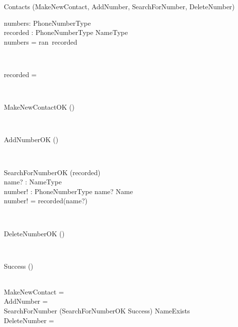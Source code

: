 \begin{class}{Contacts}
\also
\upharpoonright (MakeNewContact, AddNumber, SearchForNumber, DeleteNumber) \\
\begin{state}
numbers:  PhoneNumberType\\
recorded : PhoneNumberType \rightarrow NameType\\
\where
numbers = ran~recorded
\end{state} \\
\begin{init}
recorded = \emptyset %
\end{init} \\
\begin{op}{MakeNewContactOK}
\Delta () \\
\ST
\end{op}\\
\begin{op}{AddNumberOK}
\Delta () \\
\ST
\end{op}\\
\begin{op}{SearchForNumberOK}
    \Xi (recorded) \\
    name? : NameType\\
    number! :  PhoneNumberType
    \ST
    name? \in Name\\
    number! = recorded(name?)
    \end{op}\\
\begin{op}{DeleteNumberOK}
\Delta () \\
\ST
\end{op}\\
\begin{op}{Success}
\Delta () \\
\ST
\end{op}\\ %
\also
MakeNewContact =\\
AddNumber = \\
SearchForNumber \sdef (SearchForNumberOK \wedge Success) \vee \neg NameExists \\
DeleteNumber =
\end{class}
